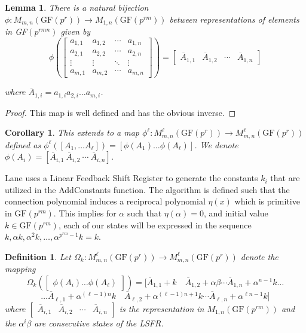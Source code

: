 \documentclass[11pt]{amsart}
\newcommand{\GF}{\mathrm{GF}}
\newtheorem{definition}{{\bf Definition}}
\newtheorem{lemma}[theorem]{{\bf Lemma }}
\newtheorem{corollary}[theorem]{{\bf Corollary}}
\begin{document}
\begin{lemma}
There is a natural bijection $\phi : M_{m,n}(\GF(p^r)) \to M_{1,n}(\GF(p^{rm}))$ between representations of elements in GF$(p^{rmn})$ given by \[\phi \left( \begin{bmatrix}
  a_{1,1} & a_{1,2} & \cdots & a_{1,n} \\
  a_{2,1} & a_{2,2} & \cdots & a_{2,n} \\
  \vdots  & \vdots  & \ddots & \vdots  \\
  a_{m,1} & a_{m,2} & \cdots & a_{m,n}
 \end{bmatrix} \right) = \begin{bmatrix}
  \overline{A}_{1,1} & \overline{A}_{1,2} & \cdots & \overline{A}_{1,n}
 \end{bmatrix}\]

  where $\overline{A}_{1,i} = a_{1,i}a_{2,i} \dots a_{m,i}$.
\end{lemma}
\begin{proof}
This map is well defined and has the obvious inverse.
\end{proof}
\begin{corollary}
This extends to a map $\phi^\ell : M^\ell_{m,n}(\text{GF}(p^r)) \to M^\ell_{m,n}(\text{GF}(p^r))$ defined as $\phi^\ell([A_1, \dots A_\ell]) = [\phi(A_1) \dots \phi(A_\ell)]$. We denote $\phi(A_i) = [\overline{A}_{i,1} ~ \overline{A}_{i,2} ~ \cdots ~ \overline{A}_{i,n}]$.
\end{corollary}

Lane uses a Linear Feedback Shift Register to generate the constants $k_i$ that are utilized in the AddConstants function. The algorithm is defined such that the connection polynomial induces a reciprocal polynomial $\eta(x)$ which is primitive in $\GF(p^{rm})$. This implies for $\alpha$ such that $\eta(\alpha) = 0$, and initial value $k \in \GF(p^{rm})$, each of our states will be expressed in the sequence $k, \alpha k, \alpha^2 k, \dots, \alpha^{p^{rm}-1} k = k$.

\begin{definition}
Let $\Omega_k : M^\ell_{m,n}(\text{GF}(p^r)) \to M^\ell_{m,n}(\text{GF}(p^r))$ denote the mapping
$$
\Omega_k \left(\begin{bmatrix}
  \phi(A_i) \dots \phi(A_\ell)
 \end{bmatrix} \right) =
 [ \overline{A}_{1,1} + k \quad \overline{A}_{1,2} + \alpha \beta  \cdots  \overline{A}_{1,n} + \alpha^{n -1} k \dots $$
$$
 \dots  \overline{A}_{\ell,1} + \alpha^{(\ell - 1)n} k \quad  \overline{A}_{\ell,2} + \alpha^{(\ell - 1)n + 1} k  \cdots  \overline{A}_{\ell,n} + \alpha^{\ell n - 1} k]
$$
where $\begin{bmatrix}
  \overline{A}_{i,1} & \overline{A}_{i,2} & \cdots & \overline{A}_{i,n}
 \end{bmatrix}$
 is the representation in $M_{1,n}(\GF(p^{rm}))$ and the $\alpha^i \beta$ are consecutive states of the LSFR.

\end{definition}
\end{document}
